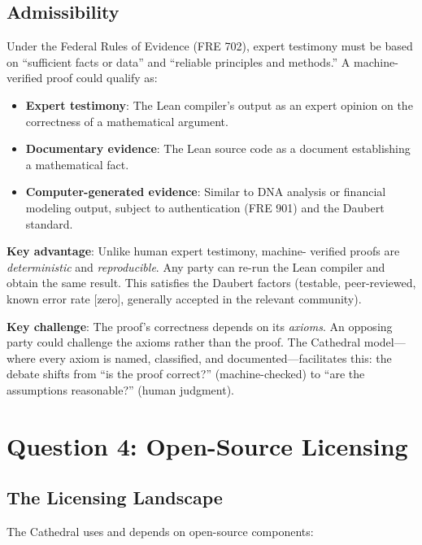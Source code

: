 \documentclass[11pt,a4paper]{article}
\begin{document}
\subsection{Admissibility}

Under the Federal Rules of Evidence (FRE 702), expert testimony
must be based on ``sufficient facts or data'' and ``reliable
principles and methods.'' A machine-verified proof could qualify
as:

\begin{itemize}
  \item \textbf{Expert testimony}: The Lean compiler's output as
    an expert opinion on the correctness of a mathematical
    argument.
  \item \textbf{Documentary evidence}: The Lean source code as a
    document establishing a mathematical fact.
  \item \textbf{Computer-generated evidence}: Similar to DNA
    analysis or financial modeling output, subject to
    authentication (FRE 901) and the Daubert standard.
\end{itemize}

\textbf{Key advantage}: Unlike human expert testimony, machine-
verified proofs are \emph{deterministic} and \emph{reproducible}.
Any party can re-run the Lean compiler and obtain the same result.
This satisfies the Daubert factors (testable, peer-reviewed,
known error rate [zero], generally accepted in the relevant
community).

\textbf{Key challenge}: The proof's correctness depends on its
\emph{axioms}. An opposing party could challenge the axioms rather
than the proof. The Cathedral model---where every axiom is named,
classified, and documented---facilitates this: the debate shifts
from ``is the proof correct?'' (machine-checked) to ``are the
assumptions reasonable?'' (human judgment).

\section{Question 4: Open-Source Licensing}
\label{sec:license}

\subsection{The Licensing Landscape}

The Cathedral uses and depends on open-source components:
\end{document}

